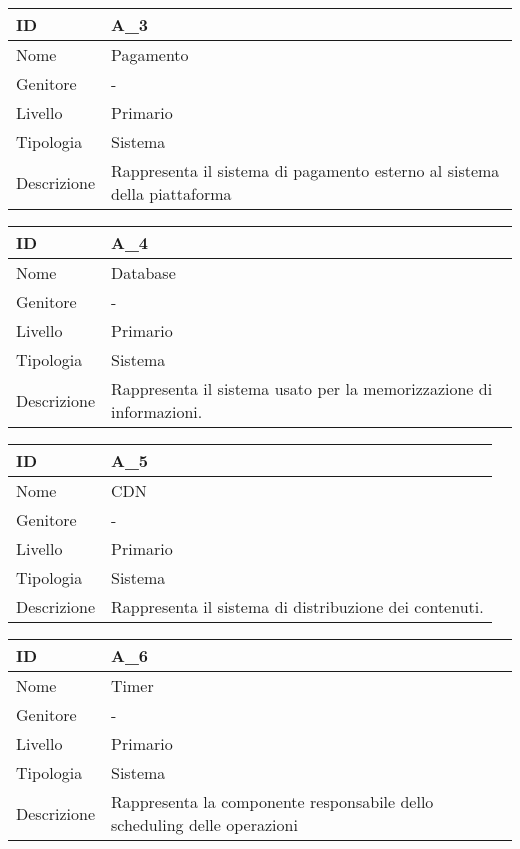\begin{center}
\begin{tabular}{ |p{2cm}|p{10cm}|  }
\hline
ID & A\_3 \\\hline
Nome & Pagamento\\\hline
Genitore & - \\\hline
Livello &  Primario \\\hline
Tipologia & Sistema \\\hline
Descrizione &  Rappresenta il sistema di pagamento esterno al sistema della piattaforma \\\hline
\end{tabular}
\label{table_attore:3}\newline

\begin{tabular}{ |p{2cm}|p{10cm}|  }
\hline
ID & A\_4 \\\hline
Nome & Database\\\hline
Genitore & - \\\hline
Livello &  Primario \\\hline
Tipologia & Sistema \\\hline
Descrizione &  Rappresenta il sistema usato per la memorizzazione di informazioni. \\\hline
\end{tabular}
\label{table_attore:4}\newline

\begin{tabular}{ |p{2cm}|p{10cm}|  }
\hline
ID & A\_5 \\\hline
Nome & CDN\\\hline
Genitore & - \\\hline
Livello &  Primario \\\hline
Tipologia & Sistema \\\hline
Descrizione &  Rappresenta il sistema di distribuzione dei contenuti. \\\hline
\end{tabular}
\label{table_attore:5}\newline

\begin{tabular}{ |p{2cm}|p{10cm}|  }
\hline
ID & A\_6 \\\hline
Nome & Timer\\\hline
Genitore & - \\\hline
Livello &  Primario \\\hline
Tipologia & Sistema \\\hline
Descrizione &  Rappresenta la componente responsabile dello scheduling delle operazioni \\\hline
\end{tabular}
\label{table_attore:6}\newline


\end{center}

